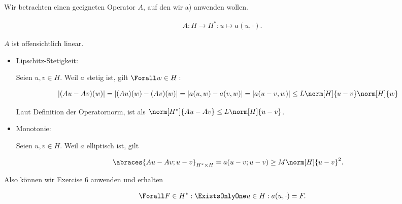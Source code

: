 \begin{solution}
\begin{enumerate}[label = \textbf{\alph*)}]
  Wir betrachten einen geeigneten Operator $A$, auf den wir a) anwenden wollen.

  \begin{align*}
    A:
    H \to H^\ast:
    u \mapsto a(u, \cdot).
  \end{align*}

  $A$ ist offensichtlich linear.

  \begin{itemize}

    \item Lipschitz-Stetigkeit:

    Seien $u, v \in H$.
    Weil $a$ stetig ist, gilt $\Forall w \in H:$

    \begin{align*}
      |(Au - Av)(w)|
      =
      |(Au)(w) - (Av)(w)|
      =
      |a(u, w) - a(v, w)|
      =
      |a(u - v, w)|
      \leq
      L \norm[H]{u - v} \norm[H]{w}
    \end{align*}

    Laut Definition der Operatornorm, ist als $\norm[H^\ast]{Au - Av} \leq L \norm[H]{u - v}$.

    \item Monotonie:

    Seien $u, v \in H$.
    Weil $a$ elliptisch ist, gilt

    \begin{align*}
      \abraces{Au - Av; u - v}_{H^\ast \times H}
      =
      a(u - v; u - v)
      \geq
      M \norm[H]{u - v}^2.
    \end{align*}

  \end{itemize}

  Also können wir Exercise 6 anwenden und erhalten

  \begin{align*}
    \Forall F \in H^\ast:
    \ExistsOnlyOne u \in H:
    a(u, \cdot) = F.
  \end{align*}

\end{enumerate}

\end{solution}

